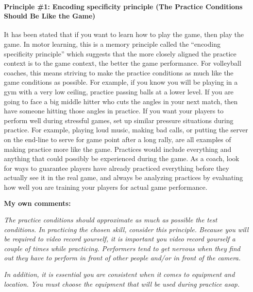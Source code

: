 \documentclass[
  letterpaper,
  DIV=11,
  numbers=noendperiod]{scrartcl}
\let\oldparagraph\paragraph
\renewcommand{\paragraph}[1]{\oldparagraph{#1}\mbox{}}
\begin{document}
\hypertarget{principle-1-encoding-specificity-principle-the-practice-conditions-should-be-like-the-game}{%
\paragraph{\texorpdfstring{\textbf{Principle \#1: Encoding specificity
principle (The Practice Conditions Should Be Like the
Game)}}{Principle \#1: Encoding specificity principle (The Practice Conditions Should Be Like the Game)}}\label{principle-1-encoding-specificity-principle-the-practice-conditions-should-be-like-the-game}}

It has been stated that if you want to learn how to play the game, then
play the game. In motor learning, this is a memory principle called the
``encoding specificity principle'' which suggests that the more closely
aligned the practice context is to the game context, the better the game
performance. For volleyball coaches, this means striving to make the
practice conditions as much like the game conditions as possible. For
example, if you know you will be playing in a gym with a very low
ceiling, practice passing balls at a lower level. If you are going to
face a big middle hitter who cuts the angles in your next match, then
have someone hitting those angles in practice. If you want your players
to perform well during stressful games, set up similar pressure
situations during practice. For example, playing loud music, making bad
calls, or putting the server on the end-line to serve for game point
after a long rally, are all examples of making practice more like the
game. Practices would include everything and anything that could
possibly be experienced during the game. As a coach, look for ways to
guarantee players have already practiced everything before they actually
see it in the real game, and always be analyzing practices by evaluating
how well you are training your players for actual game performance.

\textbf{My own comments:}

\emph{The practice conditions should approximate as much as possible the
test conditions. In practicing the chosen skill, consider this
principle. Because you will be required to video record yourself, it is
important you video record yourself a couple of times while practicing.
Performers tend to get nervous when they find out they have to perform
in front of other people and/or in front of the camera.}

\emph{In addition, it is essential you are consistent when it comes to
equipment and location. You must choose the equipment that will be used
during practice asap.}
\end{document}
